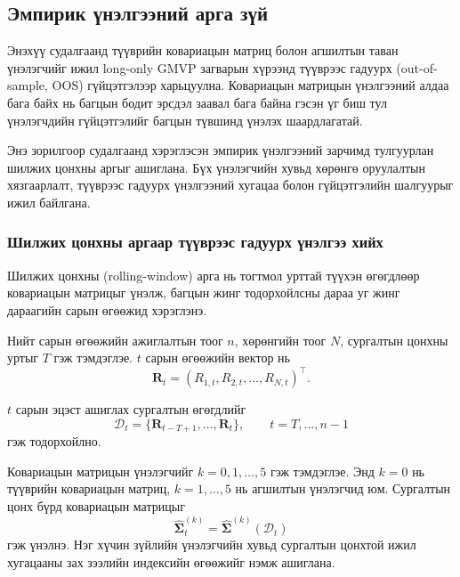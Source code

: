 \subsection{Эмпирик үнэлгээний арга зүй}
\label{subsec:empirical_framework}

Энэхүү судалгаанд түүврийн ковариацын матриц болон
агшилтын таван үнэлэгчийг ижил long-only GMVP
загварын хүрээнд түүврээс гадуурх
(out-of-sample, OOS) гүйцэтгэлээр харьцуулна.
Ковариацын матрицын үнэлгээний алдаа бага байх
нь багцын бодит эрсдэл заавал бага байна гэсэн
үг биш тул үнэлэгчдийн гүйцэтгэлийг багцын
түвшинд үнэлэх шаардлагатай.

Энэ зорилгоор
\citep{ledoitwolf2003,demiguel2009}
судалгаанд хэрэглэсэн эмпирик үнэлгээний
зарчимд тулгуурлан шилжих цонхны аргыг
ашиглана. Бүх үнэлэгчийн хувьд хөрөнгө
оруулалтын хязгаарлалт, түүврээс гадуурх
үнэлгээний хугацаа болон гүйцэтгэлийн
шалгуурыг ижил байлгана.


\subsubsection{Шилжих цонхны аргаар түүврээс гадуурх
	үнэлгээ хийх}
\label{subsubsec:rolling_window}

Шилжих цонхны (rolling-window) арга нь тогтмол
урттай түүхэн өгөгдлөөр ковариацын матрицыг
үнэлж, багцын жинг тодорхойлсны дараа уг
жинг дараагийн сарын өгөөжид хэрэглэнэ.

Нийт сарын өгөөжийн ажиглалтын тоог $n$,
хөрөнгийн тоог $N$, сургалтын цонхны
уртыг $T$ гэж тэмдэглэе.
$t$ сарын өгөөжийн вектор нь
\[
\boldsymbol{R}_t
=
(R_{1,t},R_{2,t},\ldots,R_{N,t})^\top.
\]

$t$ сарын эцэст ашиглах сургалтын өгөгдлийг
\[
\mathcal{D}_t
=
\{\boldsymbol{R}_{t-T+1},\ldots,
\boldsymbol{R}_t\},
\qquad t=T,\ldots,n-1
\]
гэж тодорхойлно.

Ковариацын матрицын үнэлэгчийг
$k=0,1,\ldots,5$ гэж тэмдэглэе.
Энд $k=0$ нь түүврийн ковариацын матриц,
$k=1,\ldots,5$ нь агшилтын үнэлэгчид юм.
Сургалтын цонх бүрд ковариацын матрицыг
\[
\widehat{\boldsymbol{\Sigma}}_t^{(k)}
=
\widehat{\boldsymbol{\Sigma}}^{(k)}
(\mathcal{D}_t)
\]
гэж үнэлнэ. Нэг хүчин зүйлийн үнэлэгчийн
хувьд сургалтын цонхтой ижил хугацааны
зах зээлийн индексийн өгөөжийг нэмж ашиглана.

